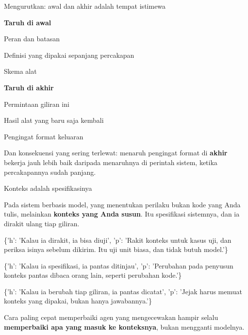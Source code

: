 \documentclass[aspectratio=169,11pt,t]{beamer}
\begin{document}
\begin{frame}[shrink=25]{Mengurutkan: awal dan akhir adalah tempat istimewa}
\begin{minipage}[t]{0.485\textwidth}
{\fontsize{9.4}{12.6}\selectfont\color{fg2}\textbf{Taruh di awal}\par}\vskip 4pt
\begin{ibullets}
\item Peran dan batasan
\item Definisi yang dipakai sepanjang percakapan
\item Skema alat
\end{ibullets}

\end{minipage}%
\hfill
\begin{minipage}[t]{0.485\textwidth}
{\fontsize{9.4}{12.6}\selectfont\color{fg2}\textbf{Taruh di akhir}\par}\vskip 4pt
\begin{ibullets}
\item Permintaan giliran ini
\item Hasil alat yang baru saja kembali
\item Pengingat format keluaran
\end{ibullets}

\end{minipage}%
{\fontsize{9.4}{12.6}\selectfont\color{fg2}Dan konsekuensi yang sering terlewat: menaruh pengingat format di \textbf{akhir} bekerja jauh lebih baik daripada menaruhnya di perintah sistem, ketika percakapannya sudah panjang.\par}\vskip 4pt
\end{frame}

\begin{frame}[shrink=25]{Konteks adalah spesifikasinya}
{\fontsize{9.4}{12.6}\selectfont\color{fg2}Pada sistem berbasis model, yang menentukan perilaku bukan kode yang Anda tulis, melainkan \textbf{konteks yang Anda susun}. Itu spesifikasi sistemnya, dan ia dirakit ulang tiap giliran.\par}\vskip 4pt
\begin{isteps}
\item \{'h': 'Kalau ia dirakit, ia bisa diuji', 'p': 'Rakit konteks untuk kasus uji, dan periksa isinya sebelum dikirim. Itu uji unit biasa, dan tidak butuh model.'\}
\item \{'h': 'Kalau ia spesifikasi, ia pantas ditinjau', 'p': 'Perubahan pada penyusun konteks pantas dibaca orang lain, seperti perubahan kode.'\}
\item \{'h': 'Kalau ia berubah tiap giliran, ia pantas dicatat', 'p': 'Jejak harus memuat konteks yang dipakai, bukan hanya jawabannya.'\}
\end{isteps}
\begin{iband}[signal]
Cara paling cepat memperbaiki agen yang mengecewakan hampir selalu \textbf{memperbaiki apa yang masuk ke konteksnya}, bukan mengganti modelnya.
\end{iband}
\end{frame}
\end{document}
